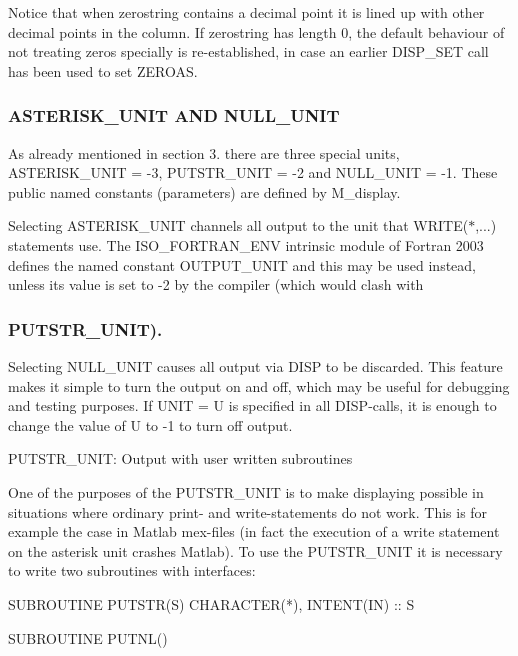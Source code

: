 Notice that when zerostring contains a decimal point it is lined up with other decimal points in the column. If zerostring has length 0, the default behaviour of not treating zeros specially is re-\/established, in case an earlier D\+I\+S\+P\+\_\+\+S\+ET call has been used to set Z\+E\+R\+O\+AS.

\subsubsection*{A\+S\+T\+E\+R\+I\+S\+K\+\_\+\+U\+N\+IT A\+ND N\+U\+L\+L\+\_\+\+U\+N\+IT}

As already mentioned in section 3. there are three special units, A\+S\+T\+E\+R\+I\+S\+K\+\_\+\+U\+N\+IT = -\/3, P\+U\+T\+S\+T\+R\+\_\+\+U\+N\+IT = -\/2 and N\+U\+L\+L\+\_\+\+U\+N\+IT = -\/1. These public named constants (parameters) are defined by M\+\_\+display.

Selecting A\+S\+T\+E\+R\+I\+S\+K\+\_\+\+U\+N\+IT channels all output to the unit that W\+R\+I\+TE($\ast$,...) statements use. The I\+S\+O\+\_\+\+F\+O\+R\+T\+R\+A\+N\+\_\+\+E\+NV intrinsic module of Fortran 2003 defines the named constant O\+U\+T\+P\+U\+T\+\_\+\+U\+N\+IT and this may be used instead, unless its value is set to -\/2 by the compiler (which would clash with \subsubsection*{P\+U\+T\+S\+T\+R\+\_\+\+U\+N\+IT).}

Selecting N\+U\+L\+L\+\_\+\+U\+N\+IT causes all output via D\+I\+SP to be discarded. This feature makes it simple to turn the output on and off, which may be useful for debugging and testing purposes. If U\+N\+IT = U is specified in all D\+I\+S\+P-\/calls, it is enough to change the value of U to -\/1 to turn off output.

P\+U\+T\+S\+T\+R\+\_\+\+U\+N\+IT\+: Output with user written subroutines

One of the purposes of the P\+U\+T\+S\+T\+R\+\_\+\+U\+N\+IT is to make displaying possible in situations where ordinary print-\/ and write-\/statements do not work. This is for example the case in Matlab mex-\/files (in fact the execution of a write statement on the asterisk unit crashes Matlab). To use the P\+U\+T\+S\+T\+R\+\_\+\+U\+N\+IT it is necessary to write two subroutines with interfaces\+: \begin{DoxyVerb}  SUBROUTINE PUTSTR(S)
  CHARACTER(*), INTENT(IN) :: S

  SUBROUTINE PUTNL()
\end{DoxyVerb}


